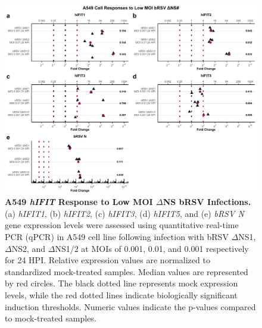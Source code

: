 \begin{figure}
    \centering
    \includegraphics[width=1\linewidth]{06. Chapter 1/Figs/01. Induction/10. a549_brsv_dns.pdf}
    \caption[A549 \textit{hIFIT} Response to Low MOI \(\Delta\)NS bRSV Infections.]{\textbf{A549 \textit{hIFIT} Response to Low MOI \(\Delta\)NS bRSV Infections.} (a) \textit{hIFIT1}, (b) \textit{hIFIT2}, (c) \textit{hIFIT3}, (d) \textit{hIFIT5}, and (e) \textit{bRSV N} gene expression levels were assessed using quantitative real-time PCR (qPCR) in A549 cell line following infection with bRSV \(\Delta\)NS1, \(\Delta\)NS2, and \(\Delta\)NS1/2 at MOIs of 0.001, 0.01, and 0.001 respectively for 24 HPI. Relative expression values are normalized to standardized mock-treated samples. Median values are represented by red circles. The black dotted line represents mock expression levels, while the red dotted lines indicate biologically significant induction thresholds. Numeric values indicate the p-values compared to mock-treated samples.}
    \label{fig:Responses of A549 to bRSV dNSs.}
\end{figure}


